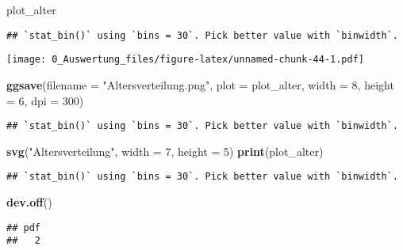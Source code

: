 \documentclass[
]{article}
\newenvironment{Shaded}{\begin{snugshade}}{\end{snugshade}}
\newcommand{\AttributeTok}[1]{\textcolor[rgb]{0.13,0.29,0.53}{#1}}
\newcommand{\DecValTok}[1]{\textcolor[rgb]{0.00,0.00,0.81}{#1}}
\newcommand{\FunctionTok}[1]{\textcolor[rgb]{0.13,0.29,0.53}{\textbf{#1}}}
\newcommand{\NormalTok}[1]{#1}
\newcommand{\StringTok}[1]{\textcolor[rgb]{0.31,0.60,0.02}{#1}}
\begin{document}
\begin{Shaded}
\begin{Highlighting}[]
\NormalTok{plot\_alter}
\end{Highlighting}
\end{Shaded}

\begin{verbatim}
## `stat_bin()` using `bins = 30`. Pick better value with `binwidth`.
\end{verbatim}

\texttt{[image: 0\_Auswertung\_files/figure-latex/unnamed-chunk-44-1.pdf]}

\begin{Shaded}
\begin{Highlighting}[]
\FunctionTok{ggsave}\NormalTok{(}\AttributeTok{filename =} \StringTok{"Altersverteilung.png"}\NormalTok{, }\AttributeTok{plot =}\NormalTok{ plot\_alter, }\AttributeTok{width =} \DecValTok{8}\NormalTok{, }\AttributeTok{height =} \DecValTok{6}\NormalTok{, }\AttributeTok{dpi =} \DecValTok{300}\NormalTok{)}
\end{Highlighting}
\end{Shaded}

\begin{verbatim}
## `stat_bin()` using `bins = 30`. Pick better value with `binwidth`.
\end{verbatim}

\begin{Shaded}
\begin{Highlighting}[]
\FunctionTok{svg}\NormalTok{(}\StringTok{"Altersverteilung"}\NormalTok{, }\AttributeTok{width =} \DecValTok{7}\NormalTok{, }\AttributeTok{height =} \DecValTok{5}\NormalTok{)}
\FunctionTok{print}\NormalTok{(plot\_alter)}
\end{Highlighting}
\end{Shaded}

\begin{verbatim}
## `stat_bin()` using `bins = 30`. Pick better value with `binwidth`.
\end{verbatim}

\begin{Shaded}
\begin{Highlighting}[]
\FunctionTok{dev.off}\NormalTok{()}
\end{Highlighting}
\end{Shaded}

\begin{verbatim}
## pdf 
##   2
\end{verbatim}
\end{document}
